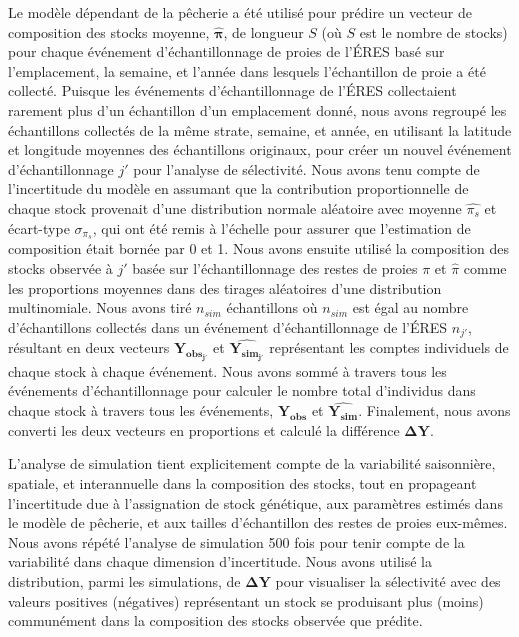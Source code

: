 Le modèle dépendant de la pêcherie a été utilisé pour prédire un vecteur de composition des stocks moyenne, $\boldsymbol{\hat{\pi}}$, de longueur $S$ (où $S$ est le nombre de stocks) pour chaque événement d'échantillonnage de proies de l'ÉRES basé sur l'emplacement, la semaine, et l'année dans lesquels l'échantillon de proie a été collecté. Puisque les événements d'échantillonnage de l'ÉRES collectaient rarement plus d'un échantillon d'un emplacement donné, nous avons regroupé les échantillons collectés de la même strate, semaine, et année, en utilisant la latitude et longitude moyennes des échantillons originaux, pour créer un nouvel événement d'échantillonnage $j'$ pour l'analyse de sélectivité. Nous avons tenu compte de l'incertitude du modèle en assumant que la contribution proportionnelle de chaque stock provenait d'une distribution normale aléatoire avec moyenne $\hat{\pi_s}$ et écart-type $\sigma_{\pi_s}$, qui ont été remis à l'échelle pour assurer que l'estimation de composition était bornée par 0 et 1. Nous avons ensuite utilisé la composition des stocks observée à $j'$ basée sur l'échantillonnage des restes de proies $\pi$ et $\hat{\pi}$ comme les proportions moyennes dans des tirages aléatoires d'une distribution multinomiale. Nous avons tiré $n_{sim}$ échantillons où $n_{sim}$ est égal au nombre d'échantillons collectés dans un événement d'échantillonnage de l'ÉRES $n_{j'}$, résultant en deux vecteurs $\boldsymbol{Y_{obs_{j'}}}$ et $\boldsymbol{\hat{Y_{sim_{j'}}}}$ représentant les comptes individuels de chaque stock à chaque événement. Nous avons sommé à travers tous les événements d'échantillonnage pour calculer le nombre total d'individus dans chaque stock à travers tous les événements, $\boldsymbol{Y_{obs}}$ et $\boldsymbol{\hat{Y_{sim}}}$. Finalement, nous avons converti les deux vecteurs en proportions et calculé la différence $\boldsymbol{\Delta{Y}}$.

L'analyse de simulation tient explicitement compte de la variabilité saisonnière, spatiale, et interannuelle dans la composition des stocks, tout en propageant l'incertitude due à l'assignation de stock génétique, aux paramètres estimés dans le modèle de pêcherie, et aux tailles d'échantillon des restes de proies eux-mêmes. Nous avons répété l'analyse de simulation 500 fois pour tenir compte de la variabilité dans chaque dimension d'incertitude. Nous avons utilisé la distribution, parmi les simulations, de $\boldsymbol{\Delta{Y}}$ pour visualiser la sélectivité avec des valeurs positives (négatives) représentant un stock se produisant plus (moins) communément dans la composition des stocks observée que prédite.

